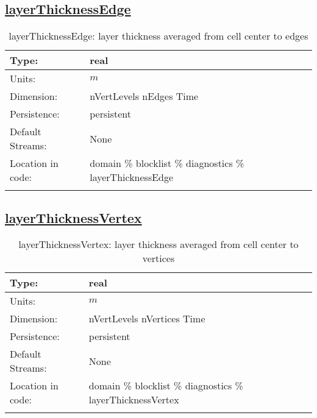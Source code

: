 \subsection[layerThicknessEdge]{\hyperref[sec:var_tab_diagnostics]{layerThicknessEdge}}
\label{subsec:var_sec_diagnostics_layerThicknessEdge}
\begin{center}
\begin{longtable}{| p{2.0in} | p{4.0in} |}
        \hline 
        Type: & real \\
        \hline 
        Units: & $m$ \\
        \hline 
        Dimension: & nVertLevels nEdges Time \\
        \hline 
        Persistence: & persistent \\
        \hline 
		 Default Streams: & None \\
        \hline 
		 Location in code: & domain \% blocklist \% diagnostics \% layerThicknessEdge \\
		 \hline 
    \caption{layerThicknessEdge: layer thickness averaged from cell center to edges}
\end{longtable}
\end{center}
\subsection[layerThicknessVertex]{\hyperref[sec:var_tab_diagnostics]{layerThicknessVertex}}
\label{subsec:var_sec_diagnostics_layerThicknessVertex}
\begin{center}
\begin{longtable}{| p{2.0in} | p{4.0in} |}
        \hline 
        Type: & real \\
        \hline 
        Units: & $m$ \\
        \hline 
        Dimension: & nVertLevels nVertices Time \\
        \hline 
        Persistence: & persistent \\
        \hline 
		 Default Streams: & None \\
        \hline 
		 Location in code: & domain \% blocklist \% diagnostics \% layerThicknessVertex \\
		 \hline 
    \caption{layerThicknessVertex: layer thickness averaged from cell center to vertices}
\end{longtable}
\end{center}
